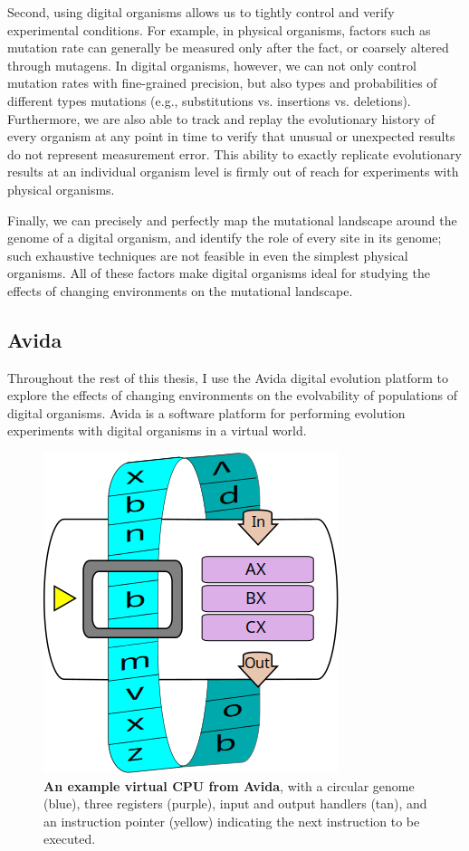 \documentclass[PhD]{msu-thesis}
\begin{document}
Second, using digital organisms allows us to tightly control and verify experimental conditions. For example, in physical organisms, factors such as mutation rate can generally be measured only after the fact, or coarsely altered through mutagens. In digital organisms, however, we can not only control mutation rates with fine-grained precision, but also types and probabilities of different types mutations (e.g., substitutions vs. insertions vs. deletions). Furthermore, we are also able to track and replay the evolutionary history of every organism at any point in time to verify that unusual or unexpected results do not represent measurement error.  This ability to exactly replicate evolutionary results at an individual organism level is firmly out of reach for experiments with physical organisms.

Finally, we can precisely and perfectly map the mutational landscape around the genome of a digital organism, and identify the role of every site in its genome\cite{ofria_evolution_2002}; such exhaustive techniques are not feasible in even the simplest physical organisms.  All of these factors make digital organisms ideal for studying the effects of changing environments on the mutational landscape.

\subsection{Avida}

Throughout the rest of this thesis, I use the Avida digital evolution platform to explore the effects of changing environments on the evolvability of populations of digital organisms.  %
Avida is a software platform for performing evolution experiments with digital organisms in a virtual world.

\begin{figure}[!h]
\includegraphics[width=0.5\columnwidth]{figures/methods/squishedCPU_extra.png}
\caption{\textbf{An example virtual CPU from Avida}, with a circular genome (blue), three registers (purple), input and output handlers (tan), and an instruction pointer (yellow) indicating the next instruction to be executed.%
}\label{fig:cpu}
\end{figure}
\end{document}
